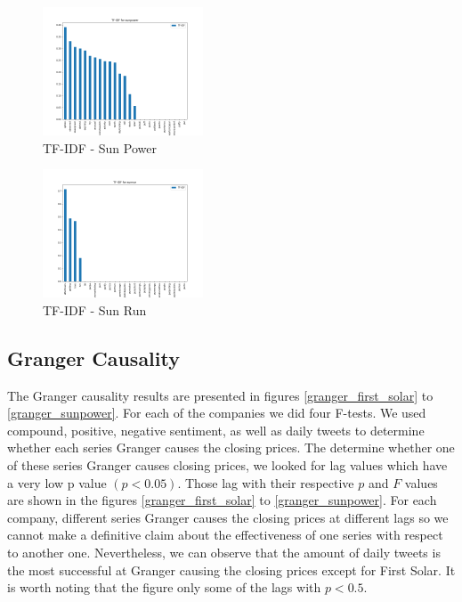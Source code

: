 \documentclass[sigconf, nonacm]{acmart}
\begin{document}
\begin{figure}[H]
  \centering
  \includegraphics[width=\linewidth, height =1.5in]{sunpowertfidf.png}
  \caption{TF-IDF - Sun Power}
\end{figure}
\begin{figure}[H]
  \centering
  \includegraphics[width=\linewidth, height =1.5in]{sunruntfidf.png}
  \caption{TF-IDF - Sun Run}
\end{figure}



\subsection{Granger Causality} 
The Granger causality results are presented in figures \ref{granger_first_solar} to \ref{granger_sunpower}. For each of the companies we did four F-tests. We used compound, positive, negative sentiment, as well as daily tweets to determine whether each series Granger causes the closing prices. The determine whether one of these series Granger causes closing prices, we looked for lag values which have a very low p value $(p < 0.05)$. Those lag with their respective $p$ and $F$ values are shown in the figures  \ref{granger_first_solar} to \ref{granger_sunpower}. \newline
For each company, different series Granger causes the closing prices at different lags so we cannot make a definitive claim about the effectiveness of one series with respect to another one. Nevertheless, we can observe that the amount of daily tweets is the most successful at Granger causing the closing prices except for First Solar.  It is worth noting that the figure only some of the lags with $p < 0.5$.
\end{document}
